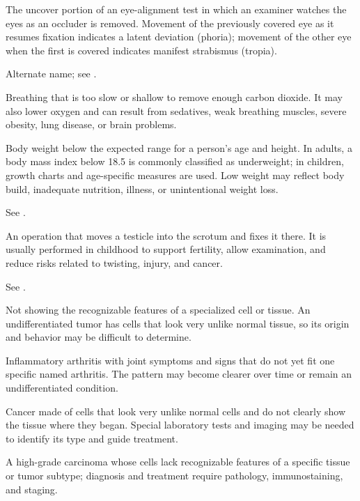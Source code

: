  The uncover portion of an eye-alignment test in which an examiner
watches the eyes as an occluder is removed. Movement of the previously covered eye as it
resumes fixation indicates a latent deviation (phoria); movement of the other eye when the
first is covered indicates manifest strabismus (tropia).

 Alternate name; see .

 Breathing that is too slow or shallow to remove enough carbon dioxide. It may also lower oxygen and can result from sedatives, weak breathing muscles, severe obesity, lung disease, or brain problems.

 Body weight below the expected range for a person’s age and height. In adults, a body mass index below 18.5 is commonly classified as underweight; in children, growth charts and age-specific measures are used. Low weight may reflect body build, inadequate nutrition, illness, or unintentional weight loss.

 See .

 An operation that moves a testicle into the scrotum and fixes it there. It is usually performed in childhood to support fertility, allow examination, and reduce risks related to twisting, injury, and cancer.

 See .

 Not showing the recognizable features of a specialized cell or tissue. An undifferentiated tumor has cells that look very unlike normal tissue, so its origin and behavior may be difficult to determine.

 Inflammatory arthritis with joint symptoms and signs that do not yet fit one specific named arthritis. The pattern may become clearer over time or remain an undifferentiated condition.

 Cancer made of cells that look very unlike normal cells and do not clearly show the tissue where they began. Special laboratory tests and imaging may be needed to identify its type and guide treatment.

 A high-grade carcinoma whose cells lack recognizable features of a specific tissue or tumor subtype; diagnosis and treatment require pathology, immunostaining, and staging.


